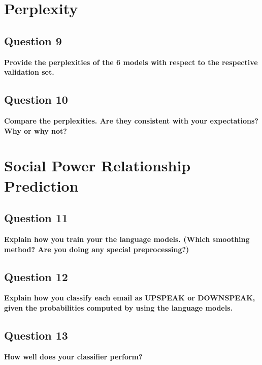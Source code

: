 \documentclass{article} %
\begin{document}
\section{Perplexity}

\subsection*{Question 9}

\textbf{Provide the perplexities of the 6 models with respect to the respective validation set.}
\\


\lipsum[2] %

\subsection*{Question 10}

\textbf{Compare the perplexities. Are they consistent with your expectations? Why or why not?}
\\

\lipsum[2]

\section{Social Power Relationship Prediction}


\subsection*{Question 11}

\textbf{Explain how you train your the language models. (Which smoothing method? Are you doing any special preprocessing?)}
\\


\lipsum[2] %

\subsection*{Question 12}

\textbf{Explain how you classify each email as UPSPEAK or DOWNSPEAK, given the probabilities computed by using the language models.}


\lipsum[2]

\subsection*{Question 13}

\textbf{How well does your classifier perform?}


\lipsum[2]
\end{document}
